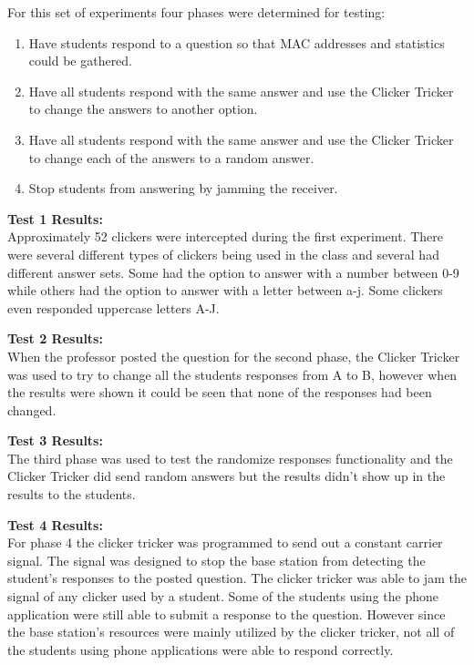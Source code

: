 For this set of experiments four phases were determined for testing:
\begin{enumerate}
\item Have students respond to a question so that MAC addresses and statistics could be gathered.
\item Have all students respond with the same answer and use the Clicker Tricker to change the answers to another option.
\item Have all students respond with the same answer and use the Clicker Tricker to change each of the answers to a random answer.
\item Stop students from answering by jamming the receiver.
\end{enumerate}

\textbf{Test 1 Results:}\\
Approximately 52 clickers were intercepted during the first experiment.  There were several different types of clickers being used in the class and several had different answer sets. Some had the option to answer with a number between 0-9 while others had the option to answer with a letter between a-j.  Some clickers even responded uppercase letters A-J. 



\textbf{Test 2 Results:}\\
When the professor posted the question for the second phase, the Clicker Tricker was used to try to change all the students responses from A to B, however when the results were shown it could be seen that none of the responses had been changed.

\textbf{Test 3 Results:}\\
The third phase was used to test the randomize responses functionality and the Clicker Tricker did send random answers but the results didn't show up in the results to the students.

\textbf{Test 4 Results:}\\
For phase 4 the clicker tricker was programmed to send out a constant carrier signal.  The signal was designed to stop the base station from detecting the student's responses to the posted question.  The clicker tricker was able to jam the signal of any clicker used by a student.  Some of the students using the phone application were still able to submit a response to the question.  However since the base station's resources were mainly utilized by the clicker tricker, not all of the students using phone applications were able to respond correctly.

